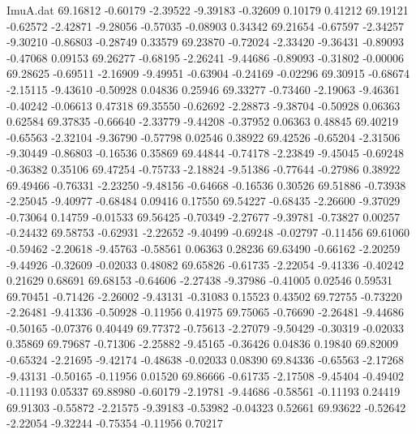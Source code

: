 \begin{filecontents}{ImuA.dat}
  69.16812   -0.60179   -2.39522   -9.39183   -0.32609    0.10179    0.41212
  69.19121   -0.62572   -2.42871   -9.28056   -0.57035   -0.08903    0.34342
  69.21654   -0.67597   -2.34257   -9.30210   -0.86803   -0.28749    0.33579
  69.23870   -0.72024   -2.33420   -9.36431   -0.89093   -0.47068    0.09153
  69.26277   -0.68195   -2.26241   -9.44686   -0.89093   -0.31802   -0.00006
  69.28625   -0.69511   -2.16909   -9.49951   -0.63904   -0.24169   -0.02296
  69.30915   -0.68674   -2.15115   -9.43610   -0.50928    0.04836    0.25946
  69.33277   -0.73460   -2.19063   -9.46361   -0.40242   -0.06613    0.47318
  69.35550   -0.62692   -2.28873   -9.38704   -0.50928    0.06363    0.62584
  69.37835   -0.66640   -2.33779   -9.44208   -0.37952    0.06363    0.48845
  69.40219   -0.65563   -2.32104   -9.36790   -0.57798    0.02546    0.38922
  69.42526   -0.65204   -2.31506   -9.30449   -0.86803   -0.16536    0.35869
  69.44844   -0.74178   -2.23849   -9.45045   -0.69248   -0.36382    0.35106
  69.47254   -0.75733   -2.18824   -9.51386   -0.77644   -0.27986    0.38922
  69.49466   -0.76331   -2.23250   -9.48156   -0.64668   -0.16536    0.30526
  69.51886   -0.73938   -2.25045   -9.40977   -0.68484    0.09416    0.17550
  69.54227   -0.68435   -2.26600   -9.37029   -0.73064    0.14759   -0.01533
  69.56425   -0.70349   -2.27677   -9.39781   -0.73827    0.00257   -0.24432
  69.58753   -0.62931   -2.22652   -9.40499   -0.69248   -0.02797   -0.11456
  69.61060   -0.59462   -2.20618   -9.45763   -0.58561    0.06363    0.28236
  69.63490   -0.66162   -2.20259   -9.44926   -0.32609   -0.02033    0.48082
  69.65826   -0.61735   -2.22054   -9.41336   -0.40242    0.21629    0.68691
  69.68153   -0.64606   -2.27438   -9.37986   -0.41005    0.02546    0.59531
  69.70451   -0.71426   -2.26002   -9.43131   -0.31083    0.15523    0.43502
  69.72755   -0.73220   -2.26481   -9.41336   -0.50928   -0.11956    0.41975
  69.75065   -0.76690   -2.26481   -9.44686   -0.50165   -0.07376    0.40449
  69.77372   -0.75613   -2.27079   -9.50429   -0.30319   -0.02033    0.35869
  69.79687   -0.71306   -2.25882   -9.45165   -0.36426    0.04836    0.19840
  69.82009   -0.65324   -2.21695   -9.42174   -0.48638   -0.02033    0.08390
  69.84336   -0.65563   -2.17268   -9.43131   -0.50165   -0.11956    0.01520
  69.86666   -0.61735   -2.17508   -9.45404   -0.49402   -0.11193    0.05337
  69.88980   -0.60179   -2.19781   -9.44686   -0.58561   -0.11193    0.24419
  69.91303   -0.55872   -2.21575   -9.39183   -0.53982   -0.04323    0.52661
  69.93622   -0.52642   -2.22054   -9.32244   -0.75354   -0.11956    0.70217

\end{filecontents}
